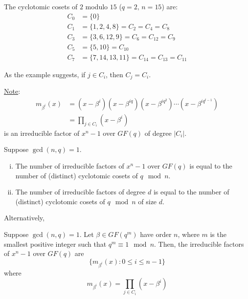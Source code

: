 \begin{exbox}
    \begin{example}
        The cyclotomic cosets of $ 2 $ modulo $ 15 $ ($ q=2,\,n=15 $) are:
        \begin{align*}
            C_0 & =\{0\}                               \\
            C_1 & =\{1,2,4,8\}=C_2=C_4=C_8             \\
            C_3 & =\{3,6,12,9\}=C_6=C_{12}=C_9         \\
            C_5 & =\{5,10\}=C_{10}                     \\
            C_7 & =\{7,14,13,11\}=C_{14}=C_{13}=C_{11}
        \end{align*}
    \end{example}
\end{exbox}
As the example suggests, if $ j\in C_i $, then $ C_j=C_i $.

\underline{Note}:
\begin{align*}
    m_{\beta^i}(x)
     & =(x-\beta^i)(x-\beta^{iq})(x-\beta^{iq^2})\cdots(x-\beta^{iq^{t-1}}) \\
     & =\prod_{j\in C_i}(x-\beta^i)
\end{align*}
is an irreducible factor of $ x^n-1 $ over $ GF(q) $ of degree $ |C_i| $.

\begin{thmbox}
    \begin{theorem}
        Suppose $ \gcd(n,q)=1 $.
        \begin{enumerate}[(i)]
            \item The number of irreducible factors of $ x^n-1 $
                  over $ GF(q) $ is equal to the number of (distinct)
                  cyclotomic cosets of $ q\mod n $.
            \item The number of irreducible factors of degree $ d $
                  is equal to the number of (distinct)
                  cyclotomic cosets of $ q\mod n $ of size $ d $.
        \end{enumerate}
    \end{theorem}
\end{thmbox}

Alternatively,
\begin{thmbox}
    \begin{theorem}
        Suppose $ \gcd(n,q)=1 $. Let $ \beta\in GF(q^m) $ have order
        $ n $, where $ m $ is the smallest positive integer such that
        $ q^m\equiv 1\mod n $. Then, the irreducible factors of $ x^n-1 $
        over $ GF(q) $ are
        \[ \{m_{\beta^i}(x):0\leqslant i\leqslant n-1\} \]
        where
        \[ m_{\beta^i}(x)=\prod_{j\in C_i}(x-\beta^i) \]
    \end{theorem}
\end{thmbox}

